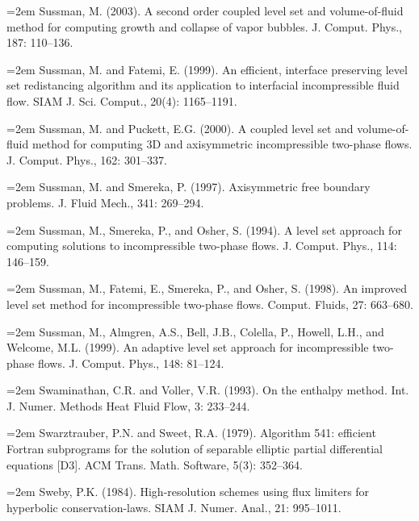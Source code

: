 \documentclass[11pt,a4paper,openany,fontset=none]{ctexbook}
\begin{document}
\par\hangindent=2em Sussman, M. (2003). A second order coupled level set and volume-of-fluid method for computing growth and collapse of vapor bubbles. J. Comput. Phys., 187: 110--136.

\par\hangindent=2em Sussman, M. and Fatemi, E. (1999). An efficient, interface preserving level set redistancing algorithm and its application to interfacial incompressible fluid flow. SIAM J. Sci. Comput., 20(4): 1165--1191.

\par\hangindent=2em Sussman, M. and Puckett, E.G. (2000). A coupled level set and volume-of-fluid method for computing 3D and axisymmetric incompressible two-phase flows. J. Comput. Phys., 162: 301--337.


\par\hangindent=2em Sussman, M. and Smereka, P. (1997). Axisymmetric free boundary problems. J. Fluid Mech., 341: 269--294.

\par\hangindent=2em Sussman, M., Smereka, P., and Osher, S. (1994). A level set approach for computing solutions to incompressible two-phase flows. J. Comput. Phys., 114: 146--159.

\par\hangindent=2em Sussman, M., Fatemi, E., Smereka, P., and Osher, S. (1998). An improved level set method for incompressible two-phase flows. Comput. Fluids, 27: 663--680.

\par\hangindent=2em Sussman, M., Almgren, A.S., Bell, J.B., Colella, P., Howell, L.H., and Welcome, M.L. (1999). An adaptive level set approach for incompressible two-phase flows. J. Comput. Phys., 148: 81--124.

\par\hangindent=2em Swaminathan, C.R. and Voller, V.R. (1993). On the enthalpy method. Int. J. Numer. Methods Heat Fluid Flow, 3: 233--244.

\par\hangindent=2em Swarztrauber, P.N. and Sweet, R.A. (1979). Algorithm 541: efficient Fortran subprograms for the solution of separable elliptic partial differential equations [D3]. ACM Trans. Math. Software, 5(3): 352--364.

\par\hangindent=2em Sweby, P.K. (1984). High-resolution schemes using flux limiters for hyperbolic conservation-laws. SIAM J. Numer. Anal., 21: 995--1011.
\end{document}
